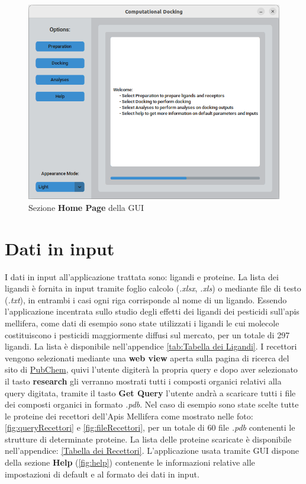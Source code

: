 \begin{figure}[H]
    \centering
    \includegraphics[scale=0.6]{immagini/homePage.png}
    \caption{Sezione \textbf{Home Page} della GUI}
    \label{fig:Home Page}
\end{figure}

\section{Dati in input}
I dati in input all'applicazione trattata sono: ligandi e proteine. La lista dei ligandi è fornita in input tramite foglio calcolo (\textit{.xlsx}, \textit{.xls}) o mediante file di testo (\textit{.txt}), 
in entrambi i casi ogni riga corrisponde al nome di un ligando. Essendo l'applicazione incentrata sullo studio degli effetti dei ligandi dei pesticidi sull'apis mellifera, 
come dati di esempio sono state utilizzati i ligandi le cui molecole costituiscono i pesticidi maggiormente diffusi sul mercato, per un totale di 297 ligandi. La lista è disponibile nell'appendice \ref{tab:Tabella dei Ligandi}.\newline
I recettori vengono selezionati mediante una \textbf{web view} aperta sulla pagina di ricerca del sito di \href{https://www.rcsb.org/search}{PubChem}, quivi l'utente digiterà la propria query e 
dopo aver selezionato il  tasto \textbf{research} gli verranno mostrati tutti i composti organici relativi alla query digitata, tramite il tasto \textbf{Get Query} l'utente andrà a 
scaricare tutti i file  dei composti organici in formato \textit{.pdb}. Nel caso di esempio sono state scelte tutte le proteine dei recettori dell'Apis Mellifera come mostrato nelle foto: 
\ref{fig:queryRecettori} e  \ref{fig:fileRecettori}, per un totale di 60 file \textit{.pdb} contenenti le strutture di determinate proteine. La lista delle proteine scaricate è disponibile nell'appendice: \ref{Tabella dei Recettori}. L'applicazione usata tramite GUI dispone della sezione \textbf{Help} (\ref{fig:help}) contenente le informazioni relative alle impostazioni di default e al formato dei dati in input.


